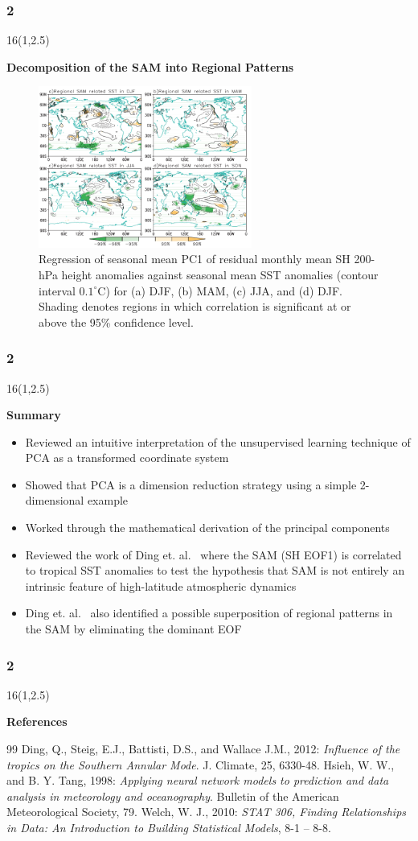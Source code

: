 \documentclass{beamer}
\newcommand\FrameText[1]{
\begin{textblock}{16}(1,2.5)
\raggedright #1
\end{textblock}}
\begin{document}
\begin{frame}
\frametitle{2}
\FrameText{\bf{\large Decomposition of the SAM into Regional Patterns}}
\begin{figure}
\centering
\includegraphics[width=7cm]{9.png}
\caption{\tiny Regression of seasonal mean PC1 of residual monthly mean SH 200-hPa height anomalies against
seasonal mean SST anomalies (contour interval $0.1^{\circ}$C) for (a) DJF, (b) MAM, (c) JJA, and (d) DJF. Shading denotes
regions in which correlation is significant at or above the 95\% confidence level.}
\label{9}
\end{figure}
\end{frame}

\begin{frame}
\frametitle{2}
\FrameText{\bf{\large Summary}}
\begin{itemize}
\item Reviewed an intuitive interpretation of the unsupervised learning technique of PCA as a transformed coordinate system
\item Showed that PCA is a dimension reduction strategy using a simple 2-dimensional example
\item Worked through the mathematical derivation of the principal components
\item Reviewed the work of Ding et. al.~\cite{din} where the SAM (SH EOF1) is correlated to tropical SST anomalies to test the hypothesis that SAM is not entirely an intrinsic feature of high-latitude atmospheric dynamics
\item Ding et. al.~\cite{din} also identified a possible superposition of regional patterns in the SAM by eliminating the dominant EOF
\end{itemize}
\end{frame}

\begin{frame}
\frametitle{2}
\FrameText{\bf{\large References}}
\begin{thebibliography}{99}
Ding, Q., Steig, E.J., Battisti, D.S., and Wallace J.M., 2012: \emph{Influence of the tropics on the Southern Annular Mode}. J. Climate, 25, 6330-48.
Hsieh, W. W., and B. Y. Tang, 1998: \emph{Applying neural network models to prediction and data analysis in meteorology and oceanography}. Bulletin of the American Meteorological Society, 79.
Welch, W. J., 2010: \emph{STAT 306, Finding Relationships in Data: An Introduction to Building Statistical Models}, 8-1 -- 8-8.
\end{thebibliography}
\end{frame}
\end{document}
